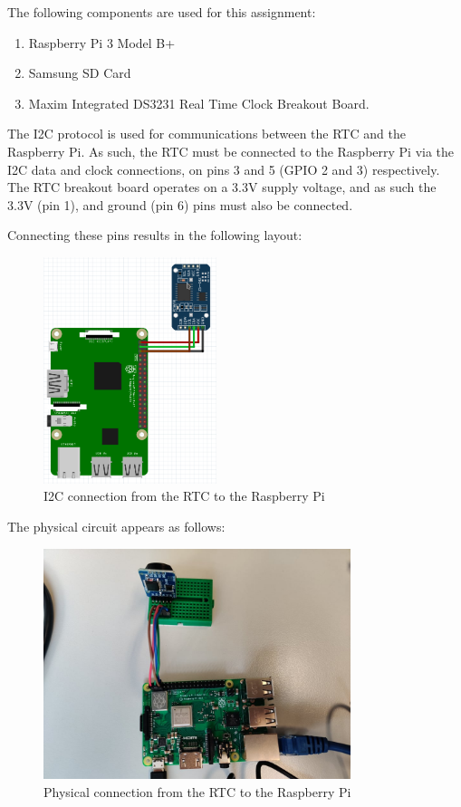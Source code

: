 The following components are used for this assignment:

\begin{enumerate}
	\item Raspberry Pi 3 Model B+
	\item Samsung SD Card
	\item Maxim Integrated DS3231 Real Time Clock Breakout Board.
\end{enumerate}

The I2C protocol is used for communications between the RTC and the Raspberry
Pi. As such, the RTC must be connected to the Raspberry Pi via the I2C data and
clock connections, on pins 3 and 5 (GPIO 2 and 3) respectively. The RTC breakout
board operates on a 3.3V supply voltage, and as such the 3.3V (pin 1), and
ground (pin 6) pins must also be connected.

Connecting these pins results in the following layout:

\begin{figure}[H]
	\centering
	\includegraphics[width=0.45\textwidth, angle=90]{images/circuit}
	\caption{I2C connection from the RTC to the Raspberry Pi}
	\label{fig:images-i2c}
\end{figure}

The physical circuit appears as follows:

\begin{figure}[H]
	\centering
	\includegraphics[width=0.8\textwidth]{images/phyCircuit}
	\caption{Physical connection from the RTC to the Raspberry Pi}
	\label{fig:images-phyCircuit}
\end{figure}

